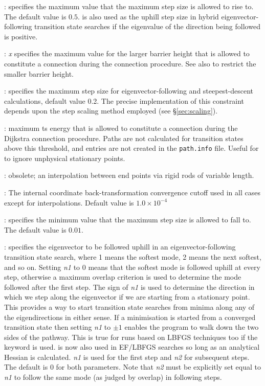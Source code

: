 {{: specifies the maximum value that the maximum step size 
is allowed to rise to. The default value is $0.5$.
{} is also used as the uphill step size in hybrid eigenvector-following
transition state searches if the eigenvalue of the direction being followed is positive.

: {\it x\/} specifies the maximum value for the larger barrier height that 
is allowed to constitute a connection during the
{ \/}connection procedure. 
See also {} to restrict the smaller barrier height.

: specifies the maximum step size for eigenvector-following and
steepest-descent calculations, default value 0.2. The precise
implementation of this constraint depends upon the step scaling method employed (see \S\ref{sec:scaling}).

: maximum ts energy that is allowed to constitute a connection during the
Dijkstra connection procedure. Paths are not calculated for transition states above
this threshold, and entries are not created in the {\tt path.info} file.
Useful for  to ignore unphysical stationary points.

: obsolete; an interpolation between 
end points via rigid rods of variable length.

: The internal coordinate back-transformation
  convergence cutoff used in all cases except for interpolations. Default
  value is $1.0\times10^{-4}$

: specifies the minimum value that the maximum step size 
is allowed to fall to. The default value is $0.01$.

: specifies the eigenvector to be followed uphill in an eigenvector-following 
transition state search,
where 1 means the softest mode, 2 means the next softest, and so on.
Setting {\it n1\/} to 0 means that the softest mode is followed uphill at every step,
otherwise a maximum overlap criterion is used to determine the mode followed after the
first step. The sign of {\it n1\/} is used to determine the direction in which we
step along the eigenvector if we are starting from a stationary point. This provides a way
to start transition state searches from minima along any of the eigendirections in
either sense. If a minimisation is started from a converged transition state then setting
{\it n1\/} to $\pm1$ enables the program to walk down the two sides of the pathway. This is true for
runs based on LBFGS techniques too if the keyword {} is used.
{} is now also used in EF/LBFGS searches so long as an analytical Hessian is
calculated. {\it n1\/} is used for the first step and {\it n2} for subsequent steps. The
default is 0 for both parameters. Note that {\it n2\/} must be explicitly set equal to
{\it n1\/} to follow the same mode (as judged by overlap) in following steps.

}}
